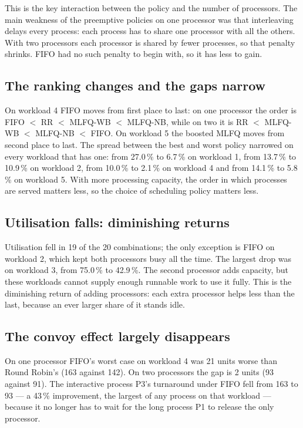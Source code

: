 \documentclass[11pt,a4paper]{article}
\begin{document}
This is the key interaction between the policy and the number of processors. The main
weakness of the preemptive policies on one processor was that interleaving delays every
process: each process has to share one processor with all the others. With two processors
each processor is shared by fewer processes, so that penalty shrinks. FIFO had no
such penalty to begin with, so it has less to gain.

\subsection{The ranking changes and the gaps narrow}

On workload 4 FIFO moves from first place to last: on one processor the order is FIFO $<$ RR $<$ MLFQ-WB $<$ MLFQ-NB, while
on two it is RR $<$ MLFQ-WB $<$ MLFQ-NB $<$ FIFO. On workload 5 the boosted MLFQ moves from second place to last. The spread between the
best and worst policy narrowed on every workload that has one: from 27.0\,\% to
6.7\,\% on workload 1, from 13.7\,\% to 10.9\,\% on workload 2, from 10.0\,\% to 2.1\,\%
on workload 4 and from 14.1\,\% to 5.8\,\% on workload 5. With more processing capacity, the order in which processes are
served matters less, so the choice of scheduling policy matters less.

\subsection{Utilisation falls: diminishing returns}

Utilisation fell in 19 of the 20 combinations; the only exception is FIFO on workload 2,
which kept both processors busy all the time. The largest drop was on workload 3, from
75.0\,\% to 42.9\,\%. The second processor adds capacity, but these workloads cannot
supply enough runnable work to use it fully. This is the diminishing return of adding
processors: each extra processor helps less than the last, because an ever larger share of it
stands idle.

\subsection{The convoy effect largely disappears}

On one processor FIFO's worst case on workload 4 was 21 units worse than Round Robin's (163
against 142). On two processors the gap is 2 units (93 against 91). The interactive process
P3's turnaround under FIFO fell from 163 to 93 --- a 43\,\% improvement, the largest of any
process on that workload --- because it no longer has to wait for the long process P1 to
release the only processor.
\end{document}
